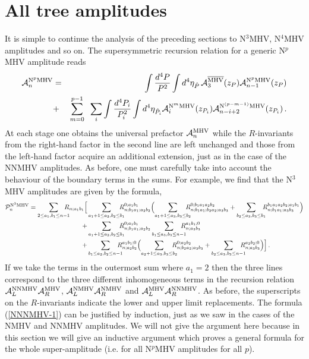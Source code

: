 \documentclass[12pt]{article}
\def \ba  {\begin{eqnarray}}
\def \ea  {\end{eqnarray}}
\newcommand \widebar [1] {\overline{#1}}
\begin{document}
{\section{All tree amplitudes}\label{sect-all}

It is simple to continue the analysis of the preceding sections to
N${}^3$MHV, N${}^4$MHV amplitudes and so on. The supersymmetric
recursion relation for a generic N${}^{p}$MHV
amplitude reads \ba \label{super-BCF-all} \mathcal{A}_{n}^{{\rm
N}^{p}{\rm MHV}} &=& \int \frac{d^{4}P}{P^2} \int d^{4}
\eta_{\hat{P}} \, \mathcal{A}_{3}^{\rm \widebar{MHV}}(z_{P})
\mathcal{A}_{n-1}^{{\rm N}^{p}{\rm MHV}}(z_{P}) \nonumber \\
 &+& \sum_{m=0}^{p-1} \; \; \sum_i  \int \frac{d^{4}P_{i}}{P_{i}^2}
\int d^{4}\eta_{\hat{P}_{i}}
 \mathcal{A}_{i}^{{\rm N}^{m}{\rm MHV}}(z_{P_{i}})
 \mathcal{A}_{n-i+2}^{{\rm N}^{(p-m-1)}{\rm MHV}}(z_{P_{i}})\,.
\ea
At each stage one obtains the universal prefactor $\mathcal{A}_n^{\rm
  MHV}$ while the $R$-invariants from the right-hand factor in the
second line are left unchanged and those from the left-hand factor
acquire an additional extension, just as in the case of the NNMHV
amplitudes. As before, one must carefully take into account the behaviour of the boundary terms in the sums.
For example, we find that the N${}^3$MHV amplitudes are given by the formula,
\begin{align}\label{NNNMHV-1}
\mathcal{P}^{\rm{N}^3\rm{MHV}}_n = \sum_{2\leq a_1,b_1 \leq n-1}
\!\!\!\!\!\! R_{n;a_1b_1}
\Bigl[&\sum_{a_1+1 \leq a_2,b_2 \leq b_1} \!\!\!\!\!\! R_{n;b_1a_1;a_2b_2}^{0;a_1b_1}
  \Bigl(\sum_{a_1+1 \leq a_3,b_3 \leq b_2}  \!\!\!\!\!\! R_{n;b_1a_1;b_2a_2;a_3b_3}^{0;b_1a_1a_2b_2}+
  \sum_{b_2 \leq a_3,b_3 \leq b_1} \!\!\!\!  R_{n;b_1a_1;a_3b_3}^{b_1a_1a_2b_2;a_1b_1} \Bigr) \notag \\
+&\sum_{a_1+1 \leq a_2,b_2 \leq b_1} \!\!\!\!\!\! R_{n;b_1a_1;a_2b_2}^{0;a_1b_1} \sum_{b_1 \leq
  a_3,b_3 \leq n-1} \!\!\!\!\!\! R_{n;a_3b_3}^{a_1b_1;0} \notag \\
+&\sum_{b_1\leq a_2,b_2 \leq n-1} \!\!\!\!\!\! R_{n;a_2b_2}^{a_1b_1;0}\Bigl(\sum_{a_2+1\leq
  a_3,b_3 \leq b_2} \!\!\!\!\!\! R_{n;b_2a_2;a_3b_3}^{0;a_2b_2} + \sum_{b_2 \leq a_3,b_3 \leq n-1}
\!\!\!\!\!\! R_{n;a_3b_3}^{a_2b_2;0}\Bigr)
\Bigr] \,.
\end{align}
If we take the terms in the outermost sum where $a_1=2$ then the three lines correspond to the three different inhomogeneous terms in the recursion relation $\mathcal{A}^{\rm NNMHV}_L \mathcal{A}^{\rm
  MHV}_R$, $\mathcal{A}^{\rm NMHV}_L \mathcal{A}^{\rm NMHV}_R$ and
$\mathcal{A}^{\rm MHV}_L \mathcal{A}^{\rm NNMHV}_R$. As before, the superscripts on the $R$-invariants indicate the lower and upper limit replacements. The formula (\ref{NNNMHV-1}) can be justified by induction, just as we saw in the cases of the NMHV and NNMHV amplitudes. We will not give the argument here because in this section we will give an inductive argument which proves a general formula for the whole super-amplitude (i.e. for all N${}^p$MHV amplitudes for all $p$).

}
\end{document}
